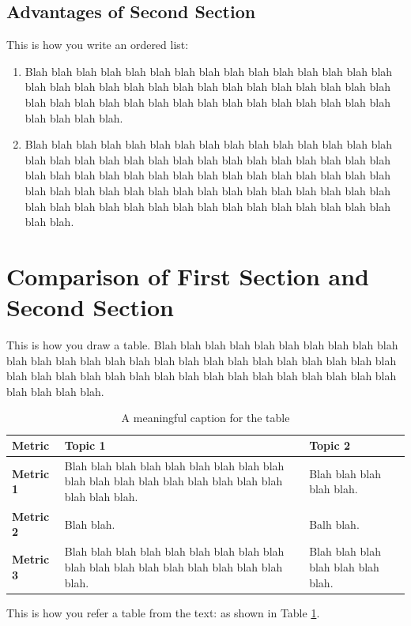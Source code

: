 \subsection{Advantages of Second Section}
This is how you write an ordered list:
\begin{enumerate}
\item Blah blah blah blah blah blah blah blah blah blah blah blah blah blah blah blah blah blah blah blah blah blah blah blah blah blah blah blah blah blah blah blah blah blah blah blah blah blah blah blah blah blah blah blah blah blah blah blah blah.

\item Blah blah blah blah blah blah blah blah blah blah blah blah blah blah blah blah blah blah blah blah blah blah blah blah blah blah blah blah blah blah blah blah blah blah blah blah blah blah blah blah blah blah blah blah blah blah blah blah blah blah blah blah blah blah blah blah blah blah blah blah blah blah blah blah blah blah blah blah blah blah blah blah blah blah blah blah blah.
\end{enumerate}

\section{Comparison of First Section and Second Section}
This is how you draw a table. Blah blah blah blah blah blah blah blah blah blah blah blah blah blah blah blah blah blah blah blah blah blah blah blah blah blah blah blah blah blah blah blah blah blah blah blah blah blah blah blah blah blah blah blah blah blah.
\begin{table}
\caption {A meaningful caption for the table}
\label{table:labelfortable}
\begin{tabularx}{\linewidth}{|X|X|X|}

\hline

\bf Metric &
\bf Topic 1 &
\bf Topic 2 \\ \hline

\bf Metric 1 &
Blah blah blah blah blah blah blah blah blah blah blah blah blah blah blah blah blah blah blah blah blah. &
Blah blah blah blah blah. \\ \hline

\bf Metric 2 &
Blah blah. &
Balh blah. \\ \hline

\bf Metric 3 &
Blah blah blah blah blah blah blah blah blah blah blah blah blah blah blah blah blah blah blah. &
Blah blah blah blah blah blah blah. \\ \hline

\end{tabularx}
\end{table}

This is how you refer a table from the text: as shown in Table \ref{table:labelfortable}.
